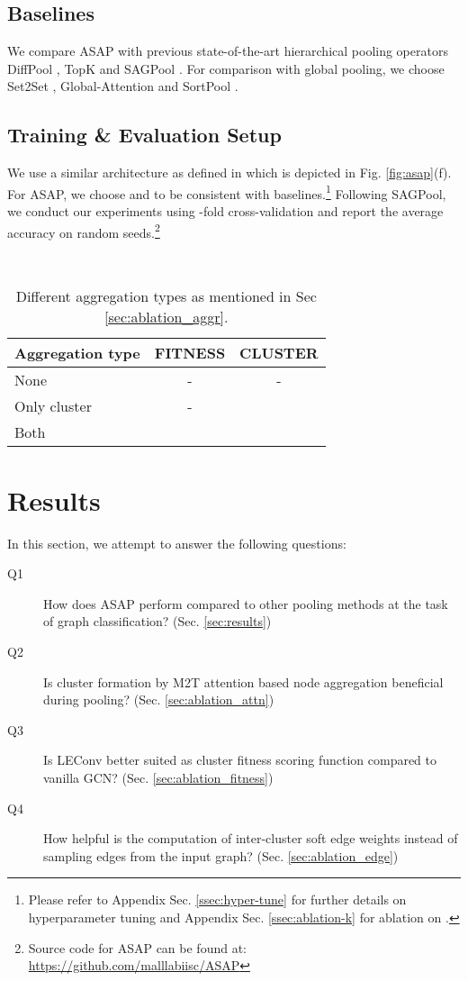 \documentclass[letterpaper]{article} \usepackage{aaai20}  \usepackage{times}  \usepackage{helvet} \usepackage{courier}  \usepackage[hyphens]{url}  \usepackage{graphicx} \urlstyle{rm} \def\UrlFont{\rm}  \usepackage{graphicx}  \frenchspacing  \setlength{\pdfpagewidth}{8.5in}  \setlength{\pdfpageheight}{11in}
\newcommand{\cmark}{\ding{51}}
\begin{document}
\subsection{Baselines}
We compare ASAP with previous state-of-the-art hierarchical pooling operators DiffPool \cite{diffpool}, TopK \cite{topk} and SAGPool \cite{sag}. For comparison with global pooling, we choose Set2Set \cite{set2set}, Global-Attention \cite{glob-att} and SortPool \cite{sortpool}.

\subsection{Training \& Evaluation Setup}
We use a similar architecture as defined in \cite{topk2,sag} which is depicted in Fig. \ref{fig:asap}(f). For ASAP, we choose  and  to be consistent with baselines.\footnote{Please refer to Appendix Sec. \ref{ssec:hyper-tune} for further details on hyperparameter tuning and Appendix Sec. \ref{ssec:ablation-k} for ablation on .} Following SAGPool\cite{sag}, we conduct our experiments using -fold cross-validation and report the average accuracy on  random seeds.\footnote{Source code for ASAP can be found at: \url{https://github.com/malllabiisc/ASAP}}


\begin{table}[!tbh]\
	\small
	\centering
	\begin{tabular}{lcc}
		\toprule
		Aggregation type & FITNESS & CLUSTER \\
		\midrule
		None 		& - 		& - 		\\
		Only cluster 		& - 		& \cmark 	\\
		Both 		& \cmark 	& \cmark 	\\
		\bottomrule
	\end{tabular}
	\caption{\label{tab:aggr_types} Different aggregation types as mentioned in Sec \ref{sec:ablation_aggr}.}
\end{table}

\section{Results}
In this section, we attempt to answer the following questions:
\begin{description}
	\item[Q1] How does ASAP perform compared to other pooling methods at the task of graph classification? (Sec. \ref{sec:results})
	\item[Q2] Is cluster formation by M2T attention based node aggregation beneficial during pooling? (Sec. \ref{sec:ablation_attn})
	\item[Q3] Is LEConv better suited as cluster fitness scoring function compared to vanilla GCN? (Sec. \ref{sec:ablation_fitness})
	\item[Q4] How helpful is the computation of inter-cluster soft edge weights instead of sampling edges from the input graph? (Sec. \ref{sec:ablation_edge})
\end{description}
\end{document}
